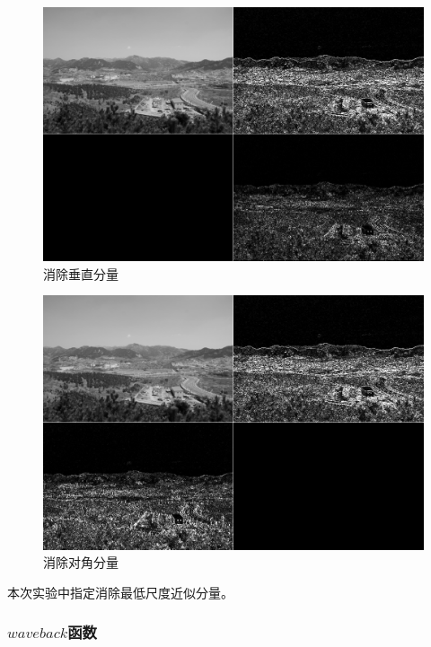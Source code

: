 \documentclass[UTF8]{ctexart}
\begin{document}
             			\begin{figure}[H]
             				\centering 
             				\includegraphics[scale=0.25]{n_eq_1_cut_v.png} 
             				\caption{消除垂直分量} 
             				\label{remove_v}
             			\end{figure}
                         
             			\begin{figure}[H]
             				\centering 
             				\includegraphics[scale=0.25]{n_eq_1_cut_d.png} 
             				\caption{消除对角分量} 
             				\label{remove_d}
             			\end{figure}                                             
                
                \indent 本次实验中指定消除最低尺度近似分量。 

            \subsubsection{$waveback$函数}
            
\end{document}
